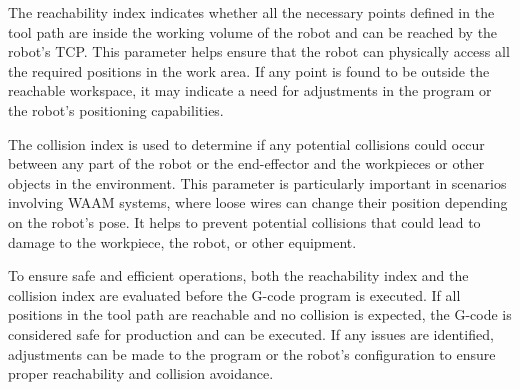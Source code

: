 The reachability index indicates whether all the necessary points defined in the tool path are inside the working volume of the robot and can be reached by the robot's TCP. This parameter helps ensure that the robot can physically access all the required positions in the work area. If any point is found to be outside the reachable workspace, it may indicate a need for adjustments in the program or the robot's positioning capabilities.

The collision index is used to determine if any potential collisions could occur between any part of the robot or the end-effector and the workpieces or other objects in the environment. This parameter is particularly important in scenarios involving WAAM systems, where loose wires can change their position depending on the robot's pose. It helps to prevent potential collisions that could lead to damage to the workpiece, the robot, or other equipment.

To ensure safe and efficient operations, both the reachability index and the collision index are evaluated before the G-code program is executed. If all positions in the tool path are reachable and no collision is expected, the G-code is considered safe for production and can be executed. If any issues are identified, adjustments can be made to the program or the robot's configuration to ensure proper reachability and collision avoidance.



